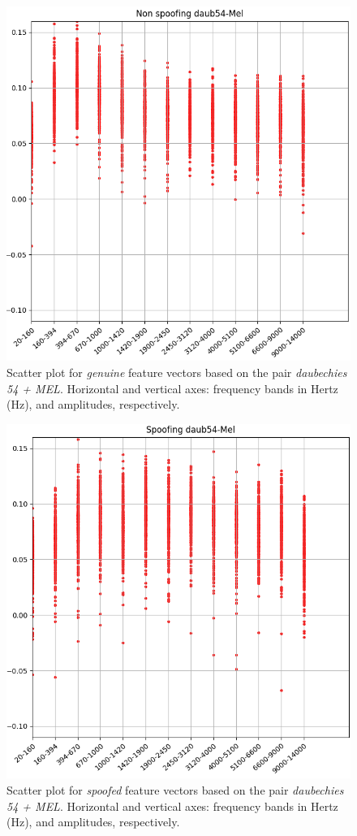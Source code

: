 		\begin{figure}[H]
			\centering
			\includegraphics[scale=.53]{images/results/barkVersusMel/liveDaub54Mel}
			\caption{Scatter plot for \textit{genuine} feature vectors  based on the pair \textit{daubechies 54 + MEL}. Horizontal and vertical axes: frequency bands in Hertz (Hz), and amplitudes, respectively.}
			\label{fig:livedaub54mel}
		\end{figure}
		\begin{figure}[H]
			\centering
			\includegraphics[scale=.53]{images/results/barkVersusMel/spoofingDaub54Mel}
			\caption{Scatter plot for \textit{spoofed} feature vectors  based on the pair \textit{daubechies 54 + MEL}. Horizontal and vertical axes: frequency bands in Hertz (Hz), and amplitudes, respectively.}
			\label{fig:spoofingdaub54mel}
		\end{figure}